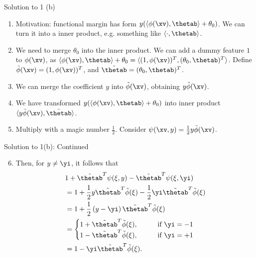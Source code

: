 \documentclass[aspectratio=169]{beamer}
\newcommand{\phitxi}{\tilde{\phi}(\xi)}
\newcommand{\psixiy}{\psi(\xi, y)}
\newcommand{\psixiyi}{\psi(\xi, \yi)}
\newcommand{\thetabt}{\tilde{\thetab}}
\begin{document}
\begin{frame}{Solution to 1 (b)}
	\begin{enumerate}
		\item<1-> Motivation: functional margin has form $y(\langle\phi(\xv), \thetab \rangle + \theta_0)$. We can turn it into a inner product, e.g. something like $\langle \cdot, \thetab\rangle$.
		\item<2-> We need to merge $\theta_0$ into the inner product. We can add a dummy feature $1$ to $\phi(\xv)$, as $\langle\phi(\xv), \thetab \rangle + \theta_0 = \langle(1, \phi(\xv) )^T,  (\theta_0, \thetab)^T \rangle$. Define $\tilde{\phi}(\xv) = (1, \phi(\xv))^T $, and $\tilde{\thetab} = (\theta_0, \thetab)^T$.
		\item<3-> We can merge the coefficient $y$ into $\tilde{\phi}(\xv)$, obtaining $y\tilde{\phi}(\xv)$.
		\item<4-> We have transformed $y(\langle\phi(\xv), \thetab \rangle + \theta_0)$ into inner product $\langle y \tilde{\phi}(\xv), \thetabt \rangle$.
		\item<5-> Multiply with a magic number $\frac{1}{2}$. Consider $\psi(\xv, y) = \frac{1}{2} y \tilde{\phi}(\xv)$.
	\end{enumerate}
\end{frame}

\begin{frame}{Solution to 1(b): Continued}
	\begin{enumerate}
		\setcounter{enumi}{5}
		\item Then, for $y \neq \yi$, it follows that 
				\begin{align*}
					& 1 + \thetabt^T \psixiy - \thetabt^T \psixiyi \\
					&= 1 + \frac{1}{2} y \thetabt^T \phitxi - \frac{1}{2} \yi \thetabt^T \phitxi \\
					&= 1 + \frac{1}{2} \left(y - \yi \right) \thetabt^T \phitxi \\
					&= \begin{cases}
						1 + \thetabt^T \phitxi, \qquad &\text{if} \ \yi = - 1 \\
						1 - \thetabt^T \phitxi, \qquad &\text{if} \ \yi = +1 \\
					\end{cases} \\
					&= 1 - \yi \thetabt^T \phitxi. \\
				\end{align*}
	\end{enumerate}
\end{frame}
\end{document}

